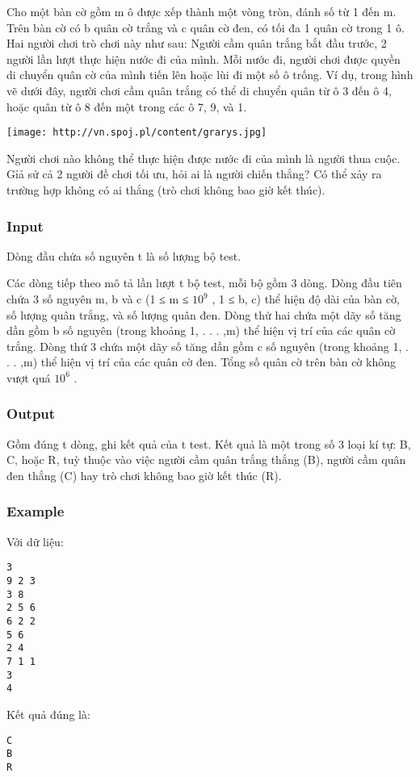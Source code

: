 







   Cho một bàn cờ gồm m ô được xếp thành một vòng tròn, đánh số từ 1 đến m. Trên bàn cờ có b quân cờ trắng và c quân cờ đen, có tối đa 1 quân cờ trong 1 ô. Hai người chơi trò chơi này như sau: Người cầm quân trắng bắt đầu trước, 2 người lần lượt thực hiện nước đi của mình. Mỗi nước đi, người chơi được quyền di chuyển quân cờ của mình tiến lên hoặc lùi đi một số ô trống. Ví dụ, trong hình vẽ dưới đây, người chơi cầm quân trắng có thể di chuyển quân từ ô 3 đến ô 4, hoặc quân từ ô 8 đến một trong các ô 7, 9, và 1.  


\texttt{[image: http://vn.spoj.pl/content/grarys.jpg]}

   Người chơi nào không thể thực hiện được nước đi của mình là người thua cuộc. Gỉả sử cả 2 người đề chơi tối ưu, hỏi ai là người chiến thắng? Có thể xảy ra trường hợp không có ai thắng (trò chơi không bao giờ kết thúc).  

\subsubsection{   Input  }

   Dòng đầu chứa số nguyên t là số lượng bộ test.  

   Các dòng tiếp theo mô tả lần lượt t bộ test, mỗi bộ gồm 3 dòng. Dòng đầu tiên chứa 3 số nguyên m, b và c (1 ≤ m ≤ $10^{9}$   , 1 ≤ b, c) thể hiện độ dài của bàn cờ, số lượng quân trắng, và số lượng quân đen. Dòng thứ hai chứa một dãy số tăng dần gồm b số nguyên (trong khoảng 1, . . . ,m) thể hiện vị trí của các quân cờ trắng. Dòng thứ 3 chứa một dãy số tăng dần gồm c số nguyên (trong khoảng 1, . . . ,m) thể hiện vị trí của các quân cờ đen. Tổng số quân cờ trên bàn cờ không vượt quá $10^{6}$   .  

\subsubsection{   Output  }

   Gồm đúng t dòng, ghi kết quả của t test. Kết quả là một trong số 3 loại kí tự: B, C, hoặc R, tuỳ thuộc vào việc người cầm quân trắng thắng (B), người cầm quân đen thắng (C) hay trò chơi không bao giờ kết thúc (R).  

\subsubsection{   Example  }

   Với dữ liệu:  
\begin{verbatim}
3
9 2 3
3 8
2 5 6
6 2 2
5 6
2 4
7 1 1
3
4
\end{verbatim}

   Kết quả đúng là:  
\begin{verbatim}
C
B
R
\end{verbatim}

